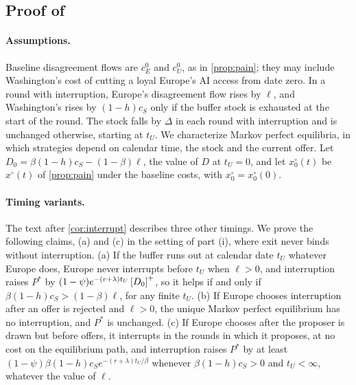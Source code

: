 \subsection{Proof of \texorpdfstring{}{interruption}}

\paragraph{Assumptions.} Baseline disagreement flows are $c^0_E$ and $c^0_U$, as in \cref{prop:pain}; they may include Washington's cost of cutting a loyal Europe's AI access from date zero. In a round with interruption, Europe's disagreement flow rises by $\ell$, and Washington's rises by $(1-h)c_S$ only if the buffer stock is exhausted at the start of the round. The stock falls by $\Delta$ in each round with interruption and is unchanged otherwise, starting at $t_U$. We characterize Markov perfect equilibria, in which strategies depend on calendar time, the stock and the current offer. Let $D_0=\beta(1-h)c_S-(1-\beta)\ell$, the value of $D$ at $t_U=0$, and let $x^\circ_0(t)$ be $x^\circ(t)$ of \cref{prop:pain} under the baseline costs, with $x^\circ_0=x^\circ_0(0)$.

\paragraph{Timing variants.} The text after \cref{cor:interrupt} describes three other timings. We prove the following claims, (a) and (c) in the setting of part (i), where exit never binds without interruption. (a) If the buffer runs out at calendar date $t_U$ whatever Europe does, Europe never interrupts before $t_U$ when $\ell>0$, and interruption raises $P^*$ by $(1-\psi)e^{-(r+\lambda)t_U}\left[D_0\right]^{+}$, so it helps if and only if $\beta(1-h)c_S>(1-\beta)\ell$, for any finite $t_U$. (b) If Europe chooses interruption after an offer is rejected and $\ell>0$, the unique Markov perfect equilibrium has no interruption, and $P^*$ is unchanged. (c) If Europe chooses after the proposer is drawn but before offers, it interrupts in the rounds in which it proposes, at no cost on the equilibrium path, and interruption raises $P^*$ by at least $(1-\psi)\beta(1-h)c_Se^{-(r+\lambda)t_U/\beta}$ whenever $\beta(1-h)c_S>0$ and $t_U<\infty$, whatever the value of $\ell$.

